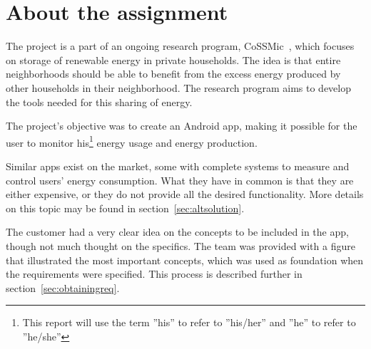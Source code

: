 \section{About the assignment}

The project is a part of an ongoing research program, CoSSMic~\cite{cossmic}, which focuses on storage of renewable energy in private households. 
The idea is that entire neighborhoods should be able to benefit from the excess energy produced by other households in their neighborhood. 
The research program aims to develop the tools needed for this sharing of energy. 

The project's objective was to create an Android \gls{app}, making it possible for the user to monitor his\footnote{This report will use the term ''his'' to refer to ''his/her'' and ''he'' to refer to ''he/she''} 
energy usage and energy production. 

Similar apps exist on the market, some with complete systems to measure and control users' energy consumption. 
What they have in common is that they are either expensive, or they do not provide all the desired functionality. More details on this topic may be found in section~\ref{sec:altsolution}.

The customer had a very clear idea on the concepts to be included in the app, though not much thought on the specifics. The team was provided with a figure that illustrated the most important concepts, which was used as foundation when the requirements were specified. 
This process is described further in section~\ref{sec:obtainingreq}.